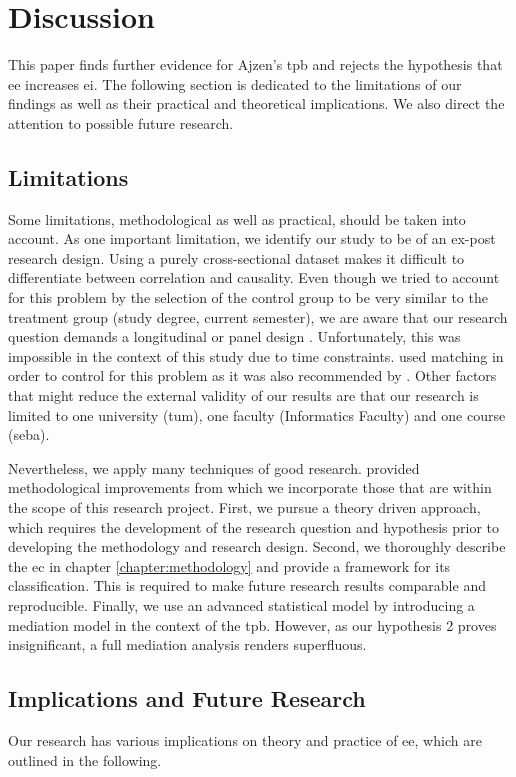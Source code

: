 \chapter{Discussion}\label{chapter:discussion}
This paper finds further evidence for Ajzen's \ac{tpb} and rejects the hypothesis that \ac{ee} increases \ac{ei}. The following section is dedicated to the limitations of our findings as well as their practical and theoretical implications. We also direct the attention to possible future research.

\section{Limitations}
Some limitations, methodological as well as practical, should be taken into account. As one important limitation, we identify our study to be of an ex-post research design. Using a purely cross-sectional dataset makes it difficult to differentiate between correlation and causality. Even though we tried to account for this problem by the selection of the control group to be very similar to the treatment group (study degree, current semester), we are aware that our research question demands a longitudinal or panel design \citep{von2010effects, lorz2013entrepreneurship}. Unfortunately, this was impossible in the context of this study due to time constraints. \citet{zhao2005mediating} used matching in order to control for this problem as it was also recommended by \citet{von2010effects}.
Other factors that might reduce the external validity of our results are that our research is limited to one university (\ac{tum}), one faculty (Informatics Faculty) and one course (\ac{seba}).

Nevertheless, we apply many techniques of good research. \citet{lorz2013entrepreneurship} provided methodological improvements from which we incorporate those that are within the scope of this research project. First, we pursue a theory driven approach, which requires the development of the research question and hypothesis prior to developing the methodology and research design. Second, we thoroughly describe the \ac{ec} in chapter \ref{chapter:methodology} and provide a framework for its classification. This is required to make future research results comparable and reproducible. Finally, we use an advanced statistical model by introducing a mediation model in the context of the \ac{tpb}. However, as our hypothesis 2 proves insignificant, a full mediation analysis renders superfluous.


\section{Implications and Future Research}
Our research has various implications on theory and practice of \ac{ee}, which are outlined in the following.

